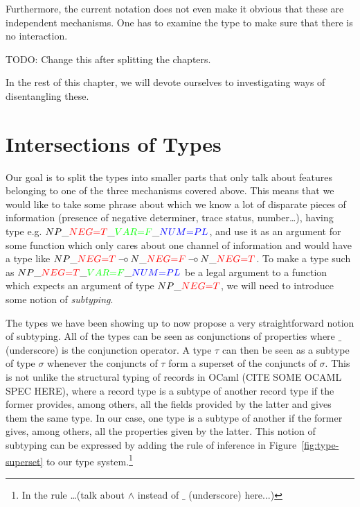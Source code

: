 Furthermore, the current notation does not even make it obvious that
these are independent mechanisms. One has to examine the type to make
sure that there is no interaction.

TODO: Change this after splitting the chapters.

In the rest of this chapter, we will devote ourselves to investigating
ways of disentangling these.

\section{Intersections of Types}

Our goal is to split the types into smaller parts that only talk about
features belonging to one of the three mechanisms covered above. This
means that we would like to take some phrase about which we know a lot
of disparate pieces of information (presence of negative determiner,
trace status, number\ldots), having type
e.g. $NP\_\textcolor{red}{NEG{=}T}\_\textcolor{green}{VAR{=}F}\_\textcolor{blue}{NUM{=}PL}$,
and use it as an argument for some function which only cares about one
channel of information and would have a type like
$NP\_\textcolor{red}{NEG{=}T} \mathbin{{-}\mkern-3.5mu{\circ}} N\_\textcolor{red}{NEG{=}F} \mathbin{{-}\mkern-3.5mu{\circ}}
N\_\textcolor{red}{NEG{=}T}$. To make a type such as
$NP\_\textcolor{red}{NEG{=}T}\_\textcolor{green}{VAR{=}F}\_\textcolor{blue}{NUM{=}PL}$
be a legal argument to a function which expects an argument of type
$NP\_\textcolor{red}{NEG{=}T}$, we will need to introduce some notion of
\emph{subtyping}.

The types we have been showing up to now propose a very straightforward
notion of subtyping. All of the types can be seen as conjunctions of
properties where $\_$ (underscore) is the conjunction operator. A type
$\tau$ can then be seen as a subtype of type $\sigma$ whenever the
conjuncts of $\tau$ form a superset of the conjuncts of $\sigma$. This
is not unlike the structural typing of records in OCaml (CITE SOME OCAML
SPEC HERE), where a record type is a subtype of another record type if
the former provides, among others, all the fields provided by the latter
and gives them the same type. In our case, one type is a subtype of
another if the former gives, among others, all the properties given by
the latter. This notion of subtyping can be expressed by adding the rule
of inference in Figure~\ref{fig:type-superset} to our type
system.\footnote{In the rule \ldots (talk about $\land$ instead of $\_$
  (underscore) here...)}

